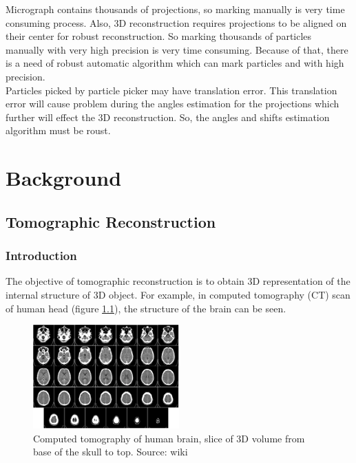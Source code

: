 \documentclass{report}
\begin{document}
Micrograph contains thousands of projections, so marking manually is very time consuming process. Also, 3D reconstruction requires projections to be aligned on their center for robust reconstruction. So marking thousands of particles manually with very high precision is very time consuming.  Because of that, there is a need of robust automatic algorithm which can mark particles and with high precision.\\

Particles picked by particle picker may have translation error. This translation error will cause problem during the angles estimation for the projections which further will effect the 3D reconstruction. So, the angles and shifts estimation algorithm must be roust. 

\chapter{Background}

\section{Tomographic Reconstruction}\label{sec:tomo_recons}
\subsection{Introduction}
The objective of tomographic reconstruction is to obtain 3D representation of the internal structure of 3D object. For example, in computed tomography (CT) scan of human head (figure \ref{fig:ct_humna_brain}), the structure of the brain can be seen.

\begin{figure}[h]
\includegraphics[width=0.5\textwidth]{Computed_tomography_of_human_brain}
\centering
\captionsetup{justification=centering}
\caption{Computed tomography of human brain, slice of 3D volume from base of the skull to top. Source: wiki}
\label{fig:ct_humna_brain}
\end{figure}
\end{document}
